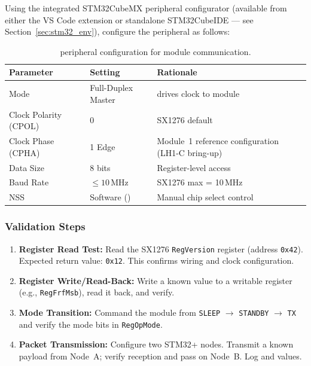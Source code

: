 \documentclass[11pt,letterpaper]{article}
\begin{document}
	Using the integrated STM32CubeMX peripheral configurator (available from either the VS Code extension or standalone STM32CubeIDE --- see Section~\ref{sec:stm32_env}), configure the \SPI{} peripheral as follows:
	
	\begin{table}[ht!]
		\centering
		\caption{\SPI{} peripheral configuration for \RF{} module communication.}
		\label{tab:spi}
		\renewcommand{\arraystretch}{1.3}
		\begin{tabular}{l l l}
			\toprule
			\textbf{Parameter} & \textbf{Setting} & \textbf{Rationale} \\
			\midrule
			Mode & Full-Duplex Master & \MCU{} drives clock to \RF{} module \\
			Clock Polarity (CPOL) & 0 & SX1276 default \\
			Clock Phase (CPHA) & 1 Edge & Module~1 reference configuration (LH1-C bring-up) \\
			Data Size & 8 bits & Register-level access \\
			Baud Rate & $\leq 10$\,MHz & SX1276 \SPI{} max = 10\,MHz \\
			NSS & Software (\GPIO{}) & Manual chip select control \\
			\bottomrule
		\end{tabular}
	\end{table}
	
	\newpage
	\subsubsection{Validation Steps}
	
	\begin{enumerate}[leftmargin=2em]
		\item \textbf{Register Read Test:} Read the SX1276 \texttt{RegVersion} register (address \texttt{0x42}). Expected return value: \texttt{0x12}. This confirms \SPI{} wiring and clock configuration.
		\item \textbf{Register Write/Read-Back:} Write a known value to a writable register (e.g., \texttt{RegFrfMsb}), read it back, and verify.
		\item \textbf{Mode Transition:} Command the module from \texttt{SLEEP} $\rightarrow$ \texttt{STANDBY} $\rightarrow$ \texttt{TX} and verify the mode bits in \texttt{RegOpMode}.
		\item \textbf{Packet Transmission:} Configure two STM32+\RF{} nodes. Transmit a known payload from Node~A; verify reception and \CRC{} pass on Node~B. Log \RSSI{} and \SNR{} values.
	\end{enumerate}
	
\end{document}
